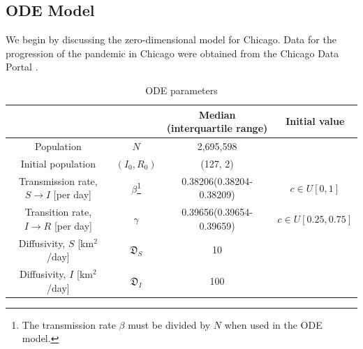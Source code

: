 \documentclass[11pt]{article}
\newcommand{\D}{\mathfrak{D}}
\begin{document}
\subsection{ODE Model}
We begin by discussing the zero-dimensional model for Chicago.
Data for the progression of the pandemic in Chicago were obtained from the Chicago Data Portal \cite{Chicago_2021}.

\begin{savenotes}
\begin{table}[h]
	\centering
	\caption{ODE parameters}
	\label{tab:parameters}
	\begin{tabular}{ c c c c }
		\hline
		\hline
			&	&	Median (interquartile range)	&	Initial value \\
		\hline
		Population	&	$N$	&	2,695,598 \\
		Initial population	&	$(I_0, R_0)$	&	(127, 2) \\
		Transmission rate, $S \rightarrow I$ [per day]	&	$\beta$\footnote{The transmission rate $\beta$ must be divided by $N$ when used in the ODE model.}	&	0.38206(0.38204-0.38209)	&	$c \in U[0,1]$ \\
		Transition rate, $I \rightarrow R$ [per day]	&	$\gamma$	&	 0.39656(0.39654-0.39659)	&	$c \in U[0.25,0.75]$ \\
		Diffusivity, $S$ [km$^2$/day]	&	$\D_S$	&	10	&	\\
		Diffusivity, $I$ [km$^2$/day]	&	$\D_I$	&	100	&	\\
		\hline
		\hline
	\end{tabular}
\end{table}
\end{savenotes}




\end{document}
